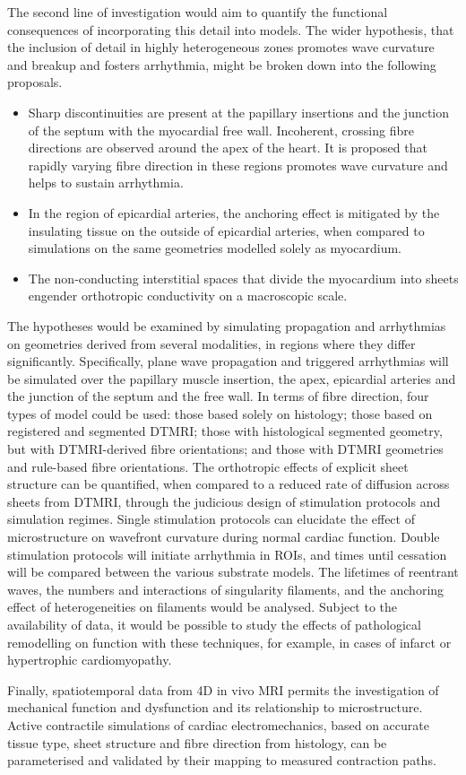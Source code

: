   The second line of investigation would aim to quantify the functional consequences of incorporating this detail into models. The wider hypothesis, that the inclusion of detail in highly heterogeneous zones promotes wave curvature and breakup and fosters arrhythmia, might be broken down into the following proposals.
  \begin{itemize}
    \item Sharp discontinuities are present at the papillary insertions and the junction of the septum with the myocardial free wall. Incoherent, crossing fibre directions are observed around the apex of the heart. It is proposed that rapidly varying fibre direction in these regions promotes wave curvature and helps to sustain arrhythmia.
    \item In the region of epicardial arteries, the anchoring effect is mitigated by the insulating tissue on the outside of epicardial arteries, when compared to simulations on the same geometries modelled solely as myocardium.
    \item The non-conducting interstitial spaces that divide the myocardium into sheets engender orthotropic conductivity on a macroscopic scale.
  \end{itemize}
  
  The hypotheses would be examined by simulating propagation and arrhythmias on geometries derived from several modalities, in regions where they differ significantly. Specifically, plane wave propagation and triggered arrhythmias will be simulated over the papillary muscle insertion, the apex, epicardial arteries and the junction of the septum and the free wall. In terms of fibre direction, four types of model could be used: those based solely on histology; those based on registered and segmented DTMRI; those with histological segmented geometry, but with DTMRI-derived fibre orientations; and those with DTMRI geometries and rule-based fibre orientations. The orthotropic effects of explicit sheet structure can be quantified, when compared to a reduced rate of diffusion across sheets from DTMRI, through the judicious design of stimulation protocols and simulation regimes. Single stimulation protocols can elucidate the effect of microstructure on wavefront curvature during normal cardiac function. Double stimulation protocols will initiate arrhythmia in ROIs, and times until cessation will be compared between the various substrate models. The lifetimes of reentrant waves, the numbers and interactions of singularity filaments, and the anchoring effect of heterogeneities on filaments would be analysed. Subject to the availability of data, it would be possible to study the effects of pathological remodelling on function with these techniques, for example, in cases of infarct or hypertrophic cardiomyopathy.
  
  Finally, spatiotemporal data from 4D in vivo MRI permits the investigation of mechanical function and dysfunction and its relationship to microstructure. Active contractile simulations of cardiac electromechanics, based on accurate tissue type, sheet structure and fibre direction from histology, can be parameterised and validated by their mapping to measured contraction paths.
